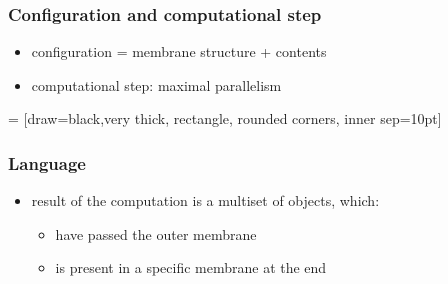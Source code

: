     \begin{frame}[t]\frametitle{Configuration and computational step}
      \begin{itemize}
        \item configuration = membrane structure + contents
        \item computational step: maximal parallelism
      \end{itemize}
       = [draw=black,very thick, rectangle, rounded corners, inner sep=10pt]
    \end{frame}
    \note{}

    \begin{frame}[t]\frametitle{Language}
      \begin{itemize}
        \item result of the computation is a multiset of objects, which:
        \begin{itemize}
          \item have passed the outer membrane
          \item is present in a specific membrane at the end
        \end{itemize}
      \end{itemize}
    \end{frame}
    \note{}
    \newpage
    \note{}

